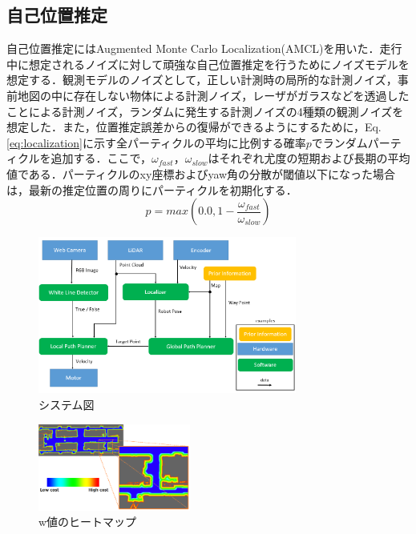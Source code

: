 \documentclass{jarticle}
\renewcommand{\%}{\textsf{\char`\%}}
\begin{document}
\subsection{自己位置推定}
自己位置推定にはAugmented Monte Carlo Localization(AMCL)\cite{localization}を用いた．走行中に想定されるノイズに対して頑強な自己位置推定を行うためにノイズモデルを想定する．観測モデルのノイズとして，正しい計測時の局所的な計測ノイズ，事前地図の中に存在しない物体による計測ノイズ，レーザがガラスなどを透過したことによる計測ノイズ，ランダムに発生する計測ノイズの4種類の観測ノイズを想定した．また，位置推定誤差からの復帰ができるようにするために，Eq. \ref{eq:localization}に示す全パーティクルの平均に比例する確率$p$でランダムパーティクルを追加する．ここで，$\omega_{fast}$，$\omega_{slow}$はそれぞれ尤度の短期および長期の平均値である．パーティクルのxy座標およびyaw角の分散が閾値以下になった場合は，最新の推定位置の周りにパーティクルを初期化する．
\vspace{-3mm}
\begin{equation}
	p = max(0.0 , 1-\frac{\omega_{fast}}{\omega_{slow}})
\label{eq:localization}
\end{equation}
\begin{figure}
	\includegraphics[width=8.5cm]{./picture/system.png}
	\caption{システム図}
	\label{fig:system}
\end{figure}
\begin{figure}
\begin{center}
	\includegraphics[width=5.0cm]{./picture/wallcostmap.png}
\end{center}
\vspace{-3mm}
	\caption{w値のヒートマップ}
	\label{fig:wallcostmap}
\end{figure}
\vspace{-3mm}
\end{document}
